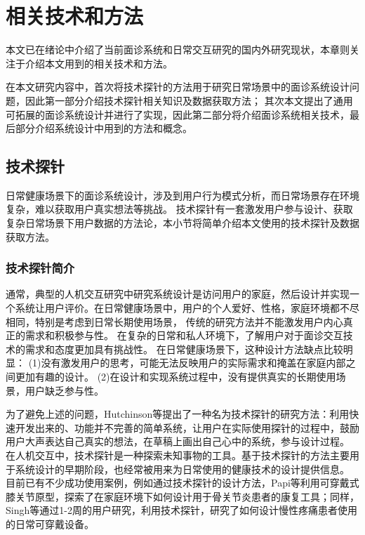 \chapter{相关技术和方法}
本文已在绪论中介绍了当前面诊系统和日常交互研究的国内外研究现状，本章则关注于介绍本文用到的相关技术和方法。

在本文研究内容中，首次将技术探针的方法用于研究日常场景中的面诊系统设计问题，因此第一部分介绍技术探针相关知识及数据获取方法；
其次本文提出了通用可拓展的面诊系统设计并进行了实现，因此第二部分将介绍面诊系统相关技术，最后部分介绍系统设计中用到的方法和概念。

\section{技术探针}
日常健康场景下的面诊系统设计，涉及到用户行为模式分析，而日常场景存在环境复杂，难以获取用户真实想法等挑战。
技术探针有一套激发用户参与设计、获取复杂日常场景下用户数据的方法论，本小节将简单介绍本文使用的技术探针及数据获取方法。
\subsection{技术探针简介}


通常，典型的人机交互研究中研究系统设计是访问用户的家庭，然后设计并实现一个系统让用户评价。在日常健康场景中，用户的个人爱好、性格，家庭环境都不尽相同，特别是考虑到日常长期使用场景，
传统的研究方法并不能激发用户内心真正的需求和积极参与性。
在复杂的日常和私人环境下，了解用户对于面诊交互技术的需求和态度更加具有挑战性。
在日常健康场景下，这种设计方法缺点比较明显\cite{Hutchinson2003Technology}：
(1)没有激发用户的思考，可能无法反映用户的实际需求和掩盖在家庭内部之间更加有趣的设计。
(2)在设计和实现系统过程中，没有提供真实的长期使用场景，用户缺乏参与性。

为了避免上述的问题，Hutchinson等\cite{Hutchinson2003Technology}提出了一种名为技术探针的研究方法：利用快速开发出来的、功能并不完善的简单系统，让用户在实际使用探针的过程中，鼓励用户大声表达自己真实的想法，在草稿上画出自己心中的系统，参与设计过程。
在人机交互中，技术探针是一种探索未知事物的工具。基于技术探针的方法主要用于系统设计的早期阶段\cite{turmo2020training}，也经常被用来为日常使用的健康技术的设计提供信息。
目前已有不少成功使用案例，例如通过技术探针的设计方法，Papi等\cite{papi2015knee}利用可穿戴式膝关节原型，探索了在家庭环境下如何设计用于骨关节炎患者的康复工具；同样，Singh等\cite{singh2017supporting}通过1-2周的用户研究，利用技术探针，研究了如何设计慢性疼痛患者使用的日常可穿戴设备。

